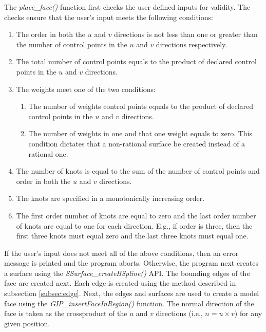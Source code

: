 \documentclass[a4paper, 12pt]{article}
\begin{document}
The \emph{place\_face()} function first checks the user defined inputs
for validity. The checks ensure that the user's input meets the 
following conditions:
\begin{enumerate}
  \item The order in both the $u$ and $v$ directions is not less than one 
      or greater than
      the number of control points in the $u$ and $v$ 
      directions respectively. 
  \item The total number of control points equals to the product of 
      declared control points in the $u$ and $v$ directions.
  \item The weights meet one of the two conditions:
  \begin{enumerate}
    \item The number of weights control points equals to the product of 
        declared control points in the $u$ and $v$ directions.
    \item The number of weights in one and that one weight equals to zero. 
        This condition dictates that a non-rational surface be created 
        instead of a rational one.
  \end{enumerate}
  \item The number of knots is equal to the sum of the number of 
      control points
      and order in both the $u$ and $v$ directions.
  \item The knots are specified in a monotonically increasing order. 
  \item The first order number of knots are equal to zero and 
      the last order number 
      of knots are equal to one for each direction. 
      E.g., if order is three, then the first three
      knots must equal zero and the last three knots must equal one.
\end{enumerate}

If the user's input does not meet all of the above conditions, then
an error message is printed and the program aborts. Otherwise, 
the program next creates a surface using the 
\emph{SSurface\_createBSpline()} 
API. The bounding edges of the face are created next. 
Each edge is created using the method described in 
subsection \ref{subsec:edge}. Next, the edges and surfaces are used to 
create a model face using the \emph{GIP\_insertFaceInRegion()} function. 
The normal direction of the face is taken as the crossproduct of 
the $u$ and $v$ directions (i.e., $n=u\times v$) for any given position. 
\end{document}
